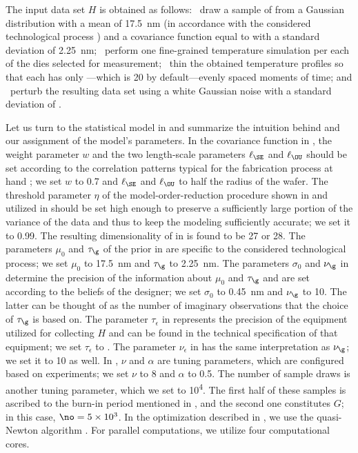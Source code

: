 The input data set $H$ is obtained as follows: \one~draw a sample of \g from a
Gaussian distribution with a mean of 17.5~nm (in accordance with the considered
technological process \cite{ptm}) and a covariance function equal to
 with a standard deviation of 2.25~nm; \two~perform one
fine-grained temperature simulation per each of the \hnd dies selected for
measurement; \three~thin the obtained temperature profiles so that each has only
\ns---which is 20 by default---evenly spaced moments of time; and \four~perturb
the resulting data set using a white Gaussian noise with a standard deviation of
.

Let us turn to the statistical model in  and
summarize the intuition behind and our assignment of the model's parameters. In
the covariance function in , the weight parameter $w$ and
the two length-scale parameters $\ell_\SE$ and $\ell_\OU$ should be set
according to the correlation patterns typical for the fabrication process at
hand \cite{chandrakasan2000, cheng2011}; we set $w$ to 0.7 and $\ell_\SE$ and
$\ell_\OU$ to half the radius of the wafer. The threshold parameter $\eta$ of
the model-order-reduction procedure shown in  and utilized
in  should be set high enough to preserve a sufficiently
large portion of the variance of the data and thus to keep the modeling
sufficiently accurate; we set it to 0.99. The resulting dimensionality \nz of
\vz in  is found to be 27 or 28. The parameters $\mu_0$
and $\tau_\g$ of the prior in  are specific to the considered
technological process; we set $\mu_0$ to 17.5~nm and $\tau_\g$ to 2.25~nm. The
parameters $\sigma_0$ and $\nu_\g$ in  determine the precision
of the information about $\mu_0$ and $\tau_\g$ and are set according to the
beliefs of the designer; we set $\sigma_0$ to 0.45~nm and $\nu_\g$ to 10. The
latter can be thought of as the number of imaginary observations that the choice
of $\tau_\g$ is based on. The parameter $\tau_\epsilon$ in 
represents the precision of the equipment utilized for collecting $H$ and can be
found in the technical specification of that equipment; we set $\tau_\epsilon$
to . The parameter $\nu_\epsilon$ in  has the same
interpretation as $\nu_\g$; we set it to 10 as well. In ,
$\nu$ and $\alpha$ are tuning parameters, which are configured based on
experiments; we set $\nu$ to 8 and $\alpha$ to 0.5. The number of sample draws
is another tuning parameter, which we set to 10\textsuperscript{4}. The first
half of these samples is ascribed to the burn-in period mentioned in
, and the second one constitutes $G$; in this case,
$\no = 5 \times 10^3$. In the optimization described in
, we use the quasi-Newton algorithm \cite{press2007}.
For parallel computations, we utilize four computational cores.

